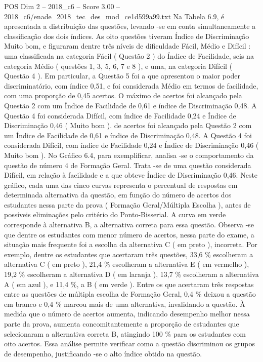 \begin{textsample}{POS Dim 2 – 2018\_c6 – Score 3.00 – 2018\_c6/enade\_2018\_tec\_des\_mod\_ce1d599a99.txt}
Na Tabela 6.9, é apresentada a distribuição das questões, levando -se em conta simultaneamente a classificação dos dois índices.
As oito questões tiveram Índice de Discriminação Muito bom, e figuraram dentre três níveis de dificuldade Fácil, Médio e Difícil : uma classificada na categoria Fácil ( Questão 2 ) do Índice de Facilidade, seis na categoria Médio ( questões 1, 3, 5, 6, 7 e 8 ), e uma, na categoria Difícil ( Questão 4 ).
Em particular, a Questão 5 foi a que apresentou o maior poder discriminatório, com índice 0,51, e foi considerada Médio em termos de facilidade, com uma proporção de 0,45 acertos.
O máximo de acertos foi alcançado pela Questão 2 com um Índice de Facilidade de 0,61 e índice de Discriminação 0,48.
A Questão 4 foi considerada Difícil, com índice de Facilidade 0,24 e Índice de Discriminação 0,46 ( Muito bom ). de acertos foi alcançado pela Questão 2 com um Índice de Facilidade de 0,61 e índice de Discriminação 0,48.
A Questão 4 foi considerada Difícil, com índice de Facilidade 0,24 e Índice de Discriminação 0,46 ( Muito bom ).
No Gráfico 6.4, para exemplificar, analisa -se o comportamento da questão de número 4 de Formação Geral.
Trata -se de uma questão considerada Difícil, em relação à facilidade e a que obteve Índice de Discriminação 0,46.
Neste gráfico, cada uma das cinco curvas representa o percentual de respostas em determinada alternativa da questão, em função do número de acertos dos estudantes nessa parte da prova ( Formação Geral/Múltipla Escolha ), antes de possíveis eliminações pelo critério do Ponto-Bisserial.
A curva em verde corresponde à alternativa B, a alternativa correta para essa questão.
Observa -se que dentre os estudantes com menor número de acertos, nessa parte do exame, a situação mais frequente foi a escolha da alternativa C ( em preto ), incorreta.
Por exemplo, dentre os estudantes que acertaram três questões, 33,6 \% escolheram a alternativa C ( em preto ), 21,4 \% escolheram a alternativa E ( em vermelho ), 19,2 \% escolheram a alternativa D ( em laranja ), 13,7 \% escolheram a alternativa A ( em azul ), e 11,4 \%, a B ( em verde ).
Entre os que acertaram três respostas entre as questões de múltipla escolha de Formação Geral, 0,4 \% deixou a questão em branco e 0,4 \% marcou mais de uma alternativa, invalidando a questão.
À medida que o número de acertos aumenta, indicando desempenho melhor nessa parte da prova, aumenta concomitantemente a proporção de estudantes que selecionaram a alternativa correta B, atingindo 100 \% para os estudantes com oito acertos.
Essa análise permite verificar como a questão discriminou os grupos de desempenho, justificando -se o alto índice obtido na questão.

\end{textsample}
